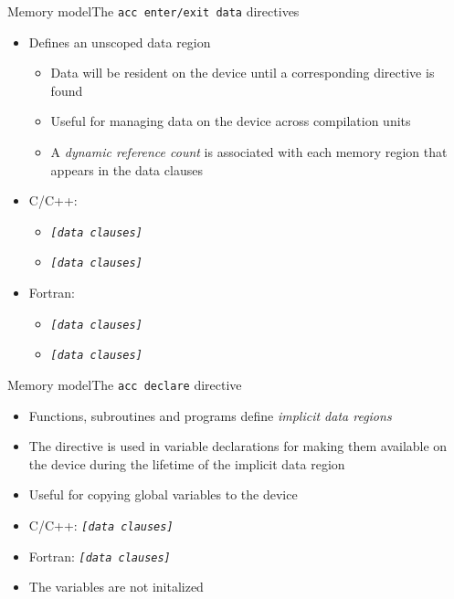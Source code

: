 \documentclass[12pt,aspectratio=169]{beamer}
\begin{document}
\begin{frame}[fragile]{Memory model}{The \texttt{acc enter/exit data} directives}
  \begin{itemize}
  \item Defines an unscoped data region
    \begin{itemize}
    \item Data will be resident on the device until a corresponding  directive is found
    \item Useful for managing data on the device across compilation units
    \item A \emph{dynamic reference count} is associated with each memory region that appears in the data clauses
    \end{itemize}
    \vfill
  \item C/C++:
    \begin{itemize}
    \item {} \emph{\texttt{[data clauses]}}
    \item{} \emph{\texttt{[data clauses]}}
    \end{itemize}
    \vfill
  \item Fortran:
    \begin{itemize}
    \item {} \emph{\texttt{[data clauses]}}
    \item {} \emph{\texttt{[data clauses]}}
    \end{itemize}
  \end{itemize}
\end{frame}

\begin{frame}[fragile]{Memory model}{The \texttt{acc declare} directive}
  \begin{itemize}
  \item Functions, subroutines and programs define \emph{implicit data regions}
  \item The  directive is used in variable declarations for making them available on the device during the lifetime of the implicit data region
  \item Useful for copying global variables to the device
    \vfill
  \item C/C++:  \emph{\texttt{[data clauses]}}
  \item Fortran:  \emph{\texttt{[data clauses]}}
    \vfill
  \item The variables are not initalized
  \end{itemize}
\end{frame}
\end{document}
